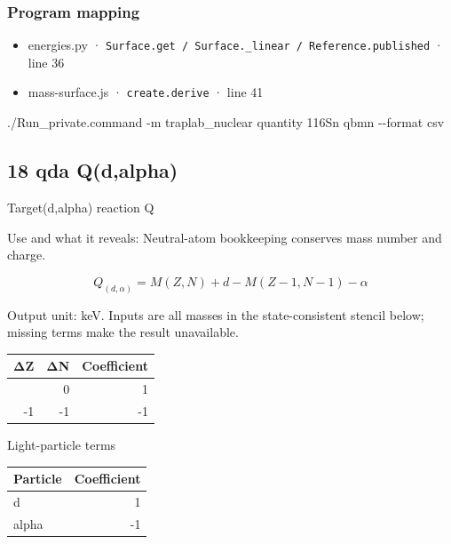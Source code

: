\documentclass[
  11pt,
  letterpaper,
]{article}
\newenvironment{Shaded}{}{}
\newcommand{\AttributeTok}[1]{\textcolor[rgb]{0.49,0.56,0.16}{#1}}
\newcommand{\ExtensionTok}[1]{#1}
\newcommand{\NormalTok}[1]{#1}
\providecommand{\tightlist}{%
  \setlength{\itemsep}{0pt}\setlength{\parskip}{0pt}}
\begin{document}
\subsubsection{Program mapping}\label{program-mapping-16}

\begin{itemize}
\tightlist
\item
  energies.py ·
  \texttt{Surface.get\ /\ Surface.\_linear\ /\ Reference.published} ·
  line 36
\item
  mass-surface.js · \texttt{create.derive} · line 41
\end{itemize}

\begin{Shaded}
\begin{Highlighting}[]
\ExtensionTok{./Run\_private.command} \AttributeTok{{-}m}\NormalTok{ traplab\_nuclear quantity 116Sn qbmn }\AttributeTok{{-}{-}format}\NormalTok{ csv}
\end{Highlighting}
\end{Shaded}

\subsection{18 qda Q(d,alpha)}\label{qda-qdalpha}

Target(d,alpha) reaction Q

Use and what it reveals: Neutral-atom bookkeeping conserves mass number
and charge.

\[
Q_{(d,\alpha)}=M(Z,N)+d-M(Z-1,N-1)-\alpha
\]

Output unit: keV. Inputs are all masses in the state-consistent stencil
below; missing terms make the result unavailable.

\begin{longtable}[]{@{}rrr@{}}
\toprule\noalign{}
ΔZ & ΔN & Coefficient \\
\midrule\noalign{}
\endhead
\bottomrule\noalign{}
\endlastfoot
0 & 0 & 1 \\
-1 & -1 & -1 \\
\end{longtable}

Light-particle terms

\begin{longtable}[]{@{}lr@{}}
\toprule\noalign{}
Particle & Coefficient \\
\midrule\noalign{}
\endhead
\bottomrule\noalign{}
\endlastfoot
d & 1 \\
alpha & -1 \\
\end{longtable}
\end{document}
